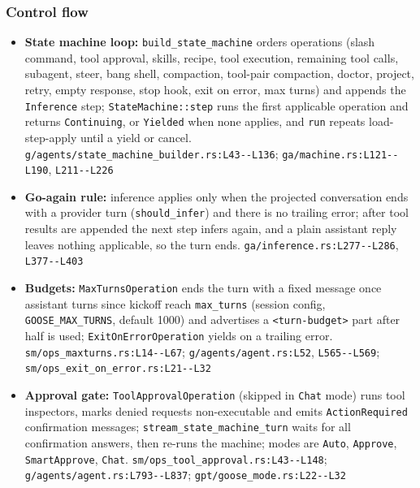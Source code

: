\subsubsection*{Control flow}
\begin{itemize}
\item \textbf{State machine loop:} \texttt{build\_\allowbreak{}state\_\allowbreak{}machine} orders operations (slash command, tool approval, skills, recipe, tool execution, remaining tool calls, subagent, steer, bang shell, compaction, tool-pair compaction, doctor, project, retry, empty response, stop hook, exit on error, max turns) and appends the \texttt{Inference} step; \texttt{StateMachine:\allowbreak{}:\allowbreak{}step} runs the first applicable operation and returns \texttt{Continuing}, or \texttt{Yielded} when none applies, and \texttt{run} repeats load-step-apply until a yield or cancel. \texttt{g/\allowbreak{}agents/\allowbreak{}state\_\allowbreak{}machine\_\allowbreak{}builder.\allowbreak{}rs:\allowbreak{}L43-\allowbreak{}-\allowbreak{}L136}; \texttt{ga/\allowbreak{}machine.\allowbreak{}rs:\allowbreak{}L121-\allowbreak{}-\allowbreak{}L190}, \texttt{L211-\allowbreak{}-\allowbreak{}L226}
\item \textbf{Go-again rule:} inference applies only when the projected conversation ends with a provider turn (\texttt{should\_\allowbreak{}infer}) and there is no trailing error; after tool results are appended the next step infers again, and a plain assistant reply leaves nothing applicable, so the turn ends. \texttt{ga/\allowbreak{}inference.\allowbreak{}rs:\allowbreak{}L277-\allowbreak{}-\allowbreak{}L286}, \texttt{L377-\allowbreak{}-\allowbreak{}L403}
\item \textbf{Budgets:} \texttt{MaxTurnsOperation} ends the turn with a fixed message once assistant turns since kickoff reach \texttt{max\_\allowbreak{}turns} (session config, \texttt{GOOSE\_\allowbreak{}MAX\_\allowbreak{}TURNS}, default 1000) and advertises a \texttt{<turn-\allowbreak{}budget>} part after half is used; \texttt{ExitOnErrorOperation} yields on a trailing error. \texttt{sm/\allowbreak{}ops\_\allowbreak{}maxturns.\allowbreak{}rs:\allowbreak{}L14-\allowbreak{}-\allowbreak{}L67}; \texttt{g/\allowbreak{}agents/\allowbreak{}agent.\allowbreak{}rs:\allowbreak{}L52}, \texttt{L565-\allowbreak{}-\allowbreak{}L569}; \texttt{sm/\allowbreak{}ops\_\allowbreak{}exit\_\allowbreak{}on\_\allowbreak{}error.\allowbreak{}rs:\allowbreak{}L21-\allowbreak{}-\allowbreak{}L32}
\item \textbf{Approval gate:} \texttt{ToolApprovalOperation} (skipped in \texttt{Chat} mode) runs tool inspectors, marks denied requests non-executable and emits \texttt{ActionRequired} confirmation messages; \texttt{stream\_\allowbreak{}state\_\allowbreak{}machine\_\allowbreak{}turn} waits for all confirmation answers, then re-runs the machine; modes are \texttt{Auto}, \texttt{Approve}, \texttt{SmartApprove}, \texttt{Chat}. \texttt{sm/\allowbreak{}ops\_\allowbreak{}tool\_\allowbreak{}approval.\allowbreak{}rs:\allowbreak{}L43-\allowbreak{}-\allowbreak{}L148}; \texttt{g/\allowbreak{}agents/\allowbreak{}agent.\allowbreak{}rs:\allowbreak{}L793-\allowbreak{}-\allowbreak{}L837}; \texttt{gpt/\allowbreak{}goose\_\allowbreak{}mode.\allowbreak{}rs:\allowbreak{}L22-\allowbreak{}-\allowbreak{}L32}

\end{itemize}
